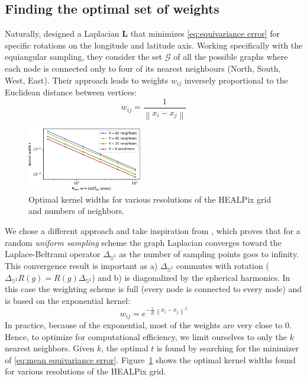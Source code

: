 \documentclass{article} %
\newcommand{\norm}[1]{\left\lVert#1\right\rVert}
\renewcommand{\b}[1]{{\bm{#1}}}  %
\newcommand{\Figref}[1]{Figure~\ref{fig:#1}}
\begin{document}
\subsection{Finding the optimal set of weights}  \label{sec:optimal}
Naturally, \cite{khasanova2017sphericalcnn} designed a Laplacian $\b{L}$ that minimizes \eqref{eq:equivariance error} for specific rotations on the longitude and latitude axis. 
Working specifically with the equiangular sampling, they consider the set $\mathcal{G}$ of all the possible graphs where each node is connected only to four of its nearest neighbours (North, South, West, East).
Their approach leads to weights $w_{ij}$ inversely proportional to the Euclidean distance between vertices:
\begin{equation} \label{eqn:weights:khasanova}
	w_{ij} = \frac{1}{\norm{x_i-x_j}}
\end{equation}


\begin{figure}
	\centering
	\vspace{-0.3cm}
	\includegraphics[width=5cm]{kernel_widths}
	\caption{
		Optimal kernel widths for various resolutions of the HEALPix grid and numbers of neighbors.
	}
	\label{fig:kernel_widths}
\end{figure}
We chose a different approach and take inspiration from \cite{belkin2005towards}, which proves that for a random \emph{uniform sampling} scheme the graph Laplacian converges toward the Laplace-Beltrami operator $\Delta_{\mathbb{S}^2}$ as the number of sampling points goes to infinity.
This convergence result is important as a) $\Delta_{\mathbb{S}^2}$ commutes with rotation ($\Delta_{\mathbb{S}^2}R(g) = R(g)\Delta_{\mathbb{S}^2}$) and b) is diagonalized by the spherical harmonics.
In this case the weighting scheme is full (every node is connected to every node) and is based on the exponential kernel:
\begin{equation} \label{eqn:weights:belkin}
w_{ij} = e^{-\frac{1}{4t} \norm{x_i-x_j}^2}
\end{equation}
In practice, because of the exponential, most of the weights are very close to $0$. Hence, to optimize for computational efficiency, we limit ourselves to only the $k$ nearest neighbors.
Given $k$, the optimal $t$ is found by searching for the minimizer of \eqref{eq:mean equivariance error}.
\Figref{kernel_widths} shows the optimal kernel widths found for various resolutions of the HEALPix grid.
\end{document}
